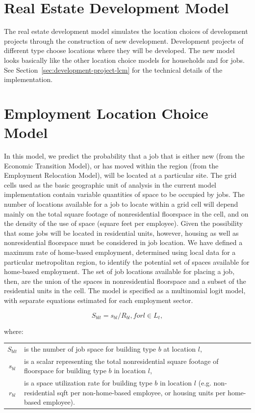 \section{Real Estate Development Model}
\label{real-estate-development-model}

The real estate development model simulates the location choices of development
projects through the construction of new development.  Development projects of
different type choose locations where they will be developed.  The new model
looks basically like the other location choice models for households and for
jobs.  See Section~\ref{sec:development-project-lcm} for the technical details
of the implementation.

\section{Employment Location Choice Model}

In this model, we predict the probability that a job that is
either new (from the Economic Transition Model), or has moved
within the region (from the Employment Relocation Model), will be
located at a particular site.  The grid cells used as the basic
geographic unit of analysis in the current model implementation
contain variable quantities of space to be occupied by jobs. The
number of locations available for a job to locate within a grid
cell will depend mainly on the total square footage of
nonresidential floorspace in the cell, and on the density of the
use of space (square feet per employee). Given the possibility
that some jobs will be located in residential units, however,
housing as well as nonresidential floorspace must be considered in
job location.  We have defined a maximum rate of home-based
employment, determined using local data for a particular
metropolitan region, to identify the potential set of spaces
available for home-based employment. The set of job locations
available for placing a job, then, are the union of the spaces in
nonresidential floorspace and a subset of the residential units in
the cell. The model is specified as a multinomial logit model,
with separate equations estimated for each employment sector.

\begin{equation}
S_{blt} = s_{bl} / R_{bl}, for l \in L_t,
\end{equation}

where:
\begin{center}
\begin{tabular}{c p{5.5in}}
$S_{blt}$ & is the number of job space for building type $b$ at location $l$, \\
$s_{bl}$ & is a scalar representing the total nonresidential square footage of floorspace for building type $b$ in location $l$,\\
$r_{bl}$ & is a space utilization rate for building type $b$ in location $l$ (e.g. non-residential sqft per non-home-based employee, or housing units per home-based employee). \\
\end{tabular}
\end{center}

